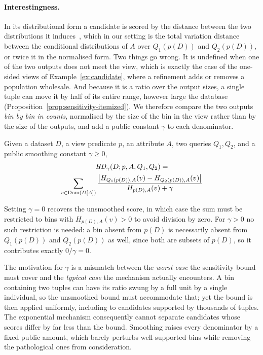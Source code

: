 \paragraph{Interestingness.}
In its distributional form a candidate is scored by the distance between the two distributions it induces~\cite{SeeDB,FEDEX}, which in our setting is the total variation distance between the conditional distributions of $A$ over $Q_1(p(D))$ and $Q_2(p(D))$, or twice it in the normalised form.
Two things go wrong.
It is undefined when one of the two outputs does not meet the view, which is exactly the case of the one-sided views of Example~\ref{ex:candidate}, where a refinement adds or removes a population wholesale.
And because it is a ratio over the output sizes, a single tuple can move it by half of its entire range, however large the database (Proposition~\ref{prop:sensitivity-itemized}).
We therefore compare the two outputs \emph{bin by bin in counts}, normalised by the size of the bin in the view rather than by the size of the outputs, and add a public constant $\gamma$ to each denominator.

\begin{definition}
\label{def:hd}
Given a dataset $D$, a view predicate $p$, an attribute $A$, two queries $Q_1,Q_2$, and a public smoothing constant $\gamma \ge 0$,
\begin{multline}
\mathit{HD}_\gamma(D;p,A,Q_1,Q_2) = \\
\sum_{v\in \operatorname{Dom}(D[A])}
\frac{\big|H_{Q_1(p(D)),A}(v)-H_{Q_2(p(D)),A}(v)\big|}
     {H_{p(D),A}(v)+\gamma}
\label{eq:hd-definition}
\end{multline}
\end{definition}

Setting $\gamma=0$ recovers the unsmoothed score, in which case the sum must be restricted to bins with $H_{p(D),A}(v)>0$ to avoid division by zero.
For $\gamma>0$ no such restriction is needed: a bin absent from $p(D)$ is necessarily absent from $Q_1(p(D))$ and $Q_2(p(D))$ as well, since both are subsets of $p(D)$, so it contributes exactly $0/\gamma=0$.

The motivation for $\gamma$ is a mismatch between the \emph{worst case} the sensitivity bound must cover and the \emph{typical case} the mechanism actually encounters.
A bin containing two tuples can have its ratio swung by a full unit by a single individual, so the unsmoothed bound must accommodate that; yet the bound is then applied uniformly, including to candidates supported by thousands of tuples.
The exponential mechanism consequently cannot separate candidates whose scores differ by far less than the bound.
Smoothing raises every denominator by a fixed public amount, which barely perturbs well-supported bins while removing the pathological ones from consideration.

